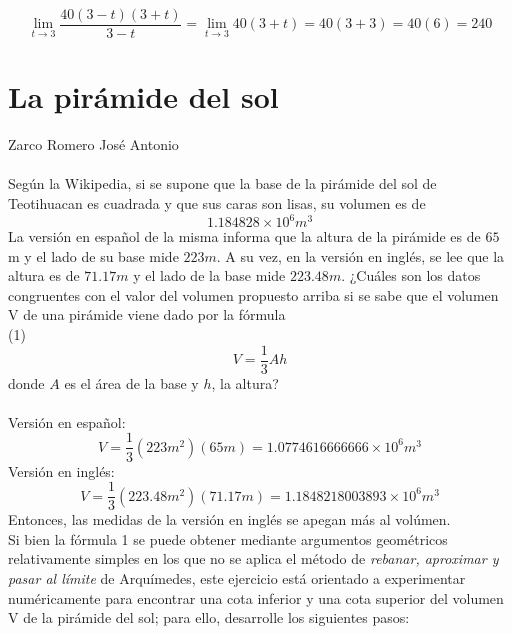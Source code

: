 \documentclass[12pt]{article}
\begin{document}
\[
\lim_{t \to 3 }\frac{40(3-t)(3+t)}{3-t}=\lim_{t \to 3 }40(3+t)=40(3+3)=40(6)=240
\]
\clearpage

\section{La pirámide del sol}
Zarco Romero José Antonio\\
\\
Según la Wikipedia, si se supone que la base de la pirámide del sol de Teotihuacan es cuadrada y que sus caras son lisas, su volumen es de
\[
1.184828 \times 10^6 m^3
\]
La versión en español de la misma informa que la altura de la pirámide es de $65$ m y el lado de su base mide $223 m$. A su vez, en la versión en inglés, se lee que la altura es de $71.17 m$ y el lado de la base mide $223.48 m$. ¿Cuáles son los datos congruentes con el valor del volumen propuesto arriba si se sabe que el volumen V de una pirámide viene dado por la fórmula
\\
(1)\\
\[
V =\frac{1}{3}Ah 
\]
donde $A$ es el  área de la base y $h$, la altura? \\ \\
Versión en español:
\[
V =\frac{1}{3}(223m^2)(65m)=1.0774616666666 \times 10^6 m^3
\]
Versión en inglés:
\[
V =\frac{1}{3}(223.48m^2)(71.17m)=1.1848218003893 \times 10^6 m^3
\]
Entonces, las medidas de la versión en inglés se apegan más al volúmen.\\

Si bien la fórmula 1 se puede obtener mediante argumentos geométricos relativamente simples en los que no se aplica el método de \textit{rebanar, aproximar y pasar al límite} de Arquímedes, este ejercicio está orientado a experimentar numéricamente para encontrar una cota inferior y una cota superior del volumen V de la pirámide del sol; para ello, desarrolle los siguientes pasos:\\
\end{document}
